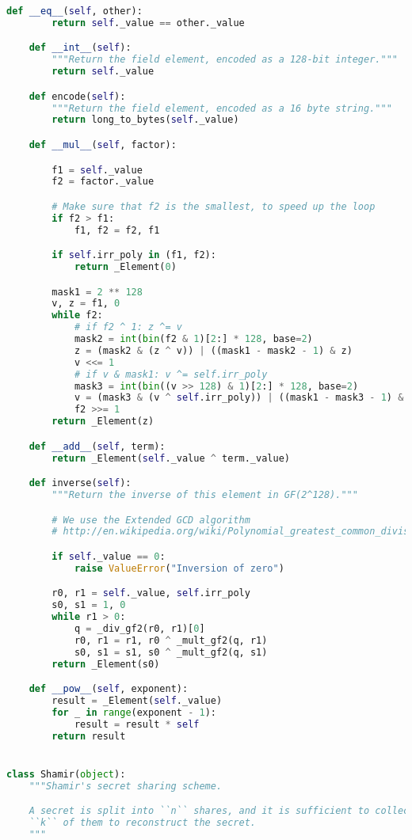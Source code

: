 \begin{lstlisting}[language = Python]
    def __eq__(self, other):
        return self._value == other._value

    def __int__(self):
        """Return the field element, encoded as a 128-bit integer."""
        return self._value

    def encode(self):
        """Return the field element, encoded as a 16 byte string."""
        return long_to_bytes(self._value)

    def __mul__(self, factor):

        f1 = self._value
        f2 = factor._value

        # Make sure that f2 is the smallest, to speed up the loop
        if f2 > f1:
            f1, f2 = f2, f1

        if self.irr_poly in (f1, f2):
            return _Element(0)

        mask1 = 2 ** 128
        v, z = f1, 0
        while f2:
            # if f2 ^ 1: z ^= v
            mask2 = int(bin(f2 & 1)[2:] * 128, base=2)
            z = (mask2 & (z ^ v)) | ((mask1 - mask2 - 1) & z)
            v <<= 1
            # if v & mask1: v ^= self.irr_poly
            mask3 = int(bin((v >> 128) & 1)[2:] * 128, base=2)
            v = (mask3 & (v ^ self.irr_poly)) | ((mask1 - mask3 - 1) & v)
            f2 >>= 1
        return _Element(z)

    def __add__(self, term):
        return _Element(self._value ^ term._value)

    def inverse(self):
        """Return the inverse of this element in GF(2^128)."""

        # We use the Extended GCD algorithm
        # http://en.wikipedia.org/wiki/Polynomial_greatest_common_divisor

        if self._value == 0:
            raise ValueError("Inversion of zero")

        r0, r1 = self._value, self.irr_poly
        s0, s1 = 1, 0
        while r1 > 0:
            q = _div_gf2(r0, r1)[0]
            r0, r1 = r1, r0 ^ _mult_gf2(q, r1)
            s0, s1 = s1, s0 ^ _mult_gf2(q, s1)
        return _Element(s0)

    def __pow__(self, exponent):
        result = _Element(self._value)
        for _ in range(exponent - 1):
            result = result * self
        return result


class Shamir(object):
    """Shamir's secret sharing scheme.

    A secret is split into ``n`` shares, and it is sufficient to collect
    ``k`` of them to reconstruct the secret.
    """


\end{lstlisting}
